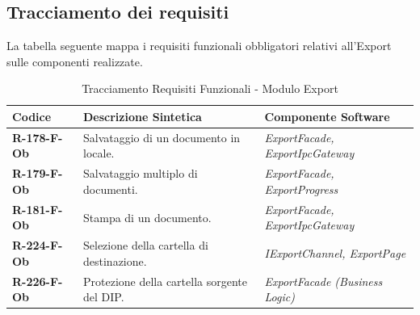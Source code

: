 \subsection{Tracciamento dei requisiti}
La tabella seguente mappa i requisiti funzionali obbligatori relativi all'Export sulle componenti realizzate.

\begin{table}[H]
    \centering
    \begin{tabular}{|p{2.5cm}|p{6.5cm}|p{5.5cm}|}
        \hline
        \rowcolor{zpusgreen!30}
        \textbf{Codice} & \textbf{Descrizione Sintetica} & \textbf{Componente Software} \\
        \hline
        \textbf{R-178-F-Ob} & Salvataggio di un documento in locale. & \textit{ExportFacade, ExportIpcGateway} \\
        \hline
        \textbf{R-179-F-Ob} & Salvataggio multiplo di documenti. & \textit{ExportFacade, ExportProgress} \\
        \hline
        \textbf{R-181-F-Ob} & Stampa di un documento. & \textit{ExportFacade, ExportIpcGateway} \\
        \hline
        \textbf{R-224-F-Ob} & Selezione della cartella di destinazione. & \textit{IExportChannel, ExportPage} \\
        \hline
        \textbf{R-226-F-Ob} & Protezione della cartella sorgente del DIP. & \textit{ExportFacade (Business Logic)} \\
        \hline
    \end{tabular}
    \caption{Tracciamento Requisiti Funzionali - Modulo Export}
\end{table}